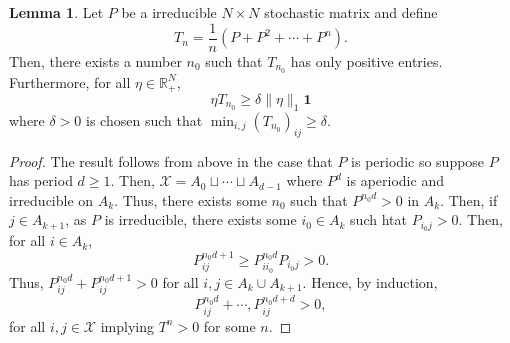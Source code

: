 \documentclass[]{article}
\theoremstyle{definition}
\theoremstyle{definition}
\newtheorem{lemma}{Lemma}[section]
\begin{document}
\begin{lemma}\label{exist_T}
  Let \(P\) be a irreducible \(N \times N\) stochastic matrix and define 
  \[T_n = \frac{1}{n}(P + P^2 + \cdots + P^n).\]
  Then, there exists a number \(n_0\) such that \(T_{n_0}\) has only positive 
  entries. Furthermore, for all \(\eta \in \mathbb{R}_+^N\), 
  \[\eta T_{n_0} \ge \delta \|\eta\|_1 \mathbf{1}\]
  where \(\delta > 0\) is chosen such that \(\min_{i, j} (T_{n_0})_{ij} \ge \delta\).
\end{lemma}
\begin{proof}
  The result follows from above in the case that \(P\) is periodic so suppose 
  \(P\) has period \(d \ge 1\). Then, \(\mathcal{X} = A_0 \sqcup \cdots \sqcup A_{d - 1}\) 
  where \(P^d\) is aperiodic and irreducible on \(A_k\). Thus, there exists some 
  \(n_0\) such that \(P^{n_0 d} > 0\) in \(A_k\). Then, if \(j \in A_{k + 1}\), 
  as \(P\) is irreducible, there exists some \(i_0 \in A_k\) such htat 
  \(P_{i_0j} > 0\). Then, for all \(i \in A_k\), 
  \[P_{ij}^{n_0d + 1} \ge P_{ii_0}^{n_0d} P_{i_0j} > 0.\]
  Thus, \(P_{ij}^{n_0 d} + P_{ij}^{n_0 d + 1} > 0\) for all \(i, j \in A_k \cup A_{k + 1}\). 
  Hence, by induction, 
  \[P_{ij}^{n_0d} + \cdots, P_{ij}^{n_0d + d} > 0,\]
  for all \(i, j \in \mathcal{X}\) implying \(T^n > 0\) for some \(n\).
\end{proof}
\end{document}

